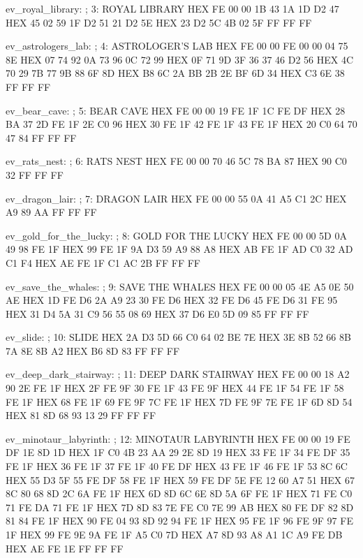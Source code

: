 \documentclass[10pt]{report}
\begin{document}
ev_royal_library:                       ; 3: ROYAL LIBRARY
    HEX FE 00 00 1B 43 1A 1D D2 47
    HEX 45 02 59 1F D2 51 21 D2 5E
    HEX 23 D2 5C 4B 02 5F FF FF FF

ev_astrologers_lab:                     ; 4: ASTROLOGER'S LAB
    HEX FE 00 00 FE 00 00 04 75 8E
    HEX 07 74 92 0A 73 96 0C 72 99
    HEX 0F 71 9D 3F 36 37 46 D2 56
    HEX 4C 70 29 7B 77 9B 88 6F 8D
    HEX B8 6C 2A BB 2B 2E BF 6D 34
    HEX C3 6E 38 FF FF FF

ev_bear_cave:                           ; 5: BEAR CAVE
    HEX FE 00 00 19 FE 1F 1C FE DF
    HEX 28 BA 37 2D FE 1F 2E C0 96
    HEX 30 FE 1F 42 FE 1F 43 FE 1F
    HEX 20 C0 64 70 47 84 FF FF FF

ev_rats_nest:                           ; 6: RATS NEST
    HEX FE 00 00 70 46 5C 78 BA 87
    HEX 90 C0 32 FF FF FF

ev_dragon_lair:                         ; 7: DRAGON LAIR
    HEX FE 00 00 55 0A 41 A5 C1 2C
    HEX A9 89 AA FF FF FF

ev_gold_for_the_lucky:                  ; 8: GOLD FOR THE LUCKY
    HEX FE 00 00 5D 0A 49 98 FE 1F
    HEX 99 FE 1F 9A D3 59 A9 88 A8
    HEX AB FE 1F AD C0 32 AD C1 F4
    HEX AE FE 1F C1 AC 2B FF FF FF

ev_save_the_whales:                     ; 9: SAVE THE WHALES
    HEX FE 00 00 05 4E A5 0E 50 AE
    HEX 1D FE D6 2A A9 23 30 FE D6
    HEX 32 FE D6 45 FE D6 31 FE 95
    HEX 31 D4 5A 31 C9 56 55 08 69
    HEX 37 D6 E0 5D 09 85 FF FF FF

ev_slide:                               ; 10: SLIDE
    HEX 2A D3 5D 66 C0 64 02 BE 7E
    HEX 3E 8B 52 66 8B 7A 8E 8B A2
    HEX B6 8D 83 FF FF FF

ev_deep_dark_stairway:                  ; 11: DEEP DARK STAIRWAY
    HEX FE 00 00 18 A2 90 2E FE 1F
    HEX 2F FE 9F 30 FE 1F 43 FE 9F
    HEX 44 FE 1F 54 FE 1F 58 FE 1F
    HEX 68 FE 1F 69 FE 9F 7C FE 1F
    HEX 7D FE 9F 7E FE 1F 6D 8D 54
    HEX 81 8D 68 93 13 29 FF FF FF

ev_minotaur_labyrinth:                  ; 12: MINOTAUR LABYRINTH
    HEX FE 00 00 19 FE DF 1E 8D 1D
    HEX 1F C0 4B 23 AA 29 2E 8D 19
    HEX 33 FE 1F 34 FE DF 35 FE 1F
    HEX 36 FE 1F 37 FE 1F 40 FE DF
    HEX 43 FE 1F 46 FE 1F 53 8C 6C
    HEX 55 D3 5F 55 FE DF 58 FE 1F
    HEX 59 FE DF 5E FE 12 60 A7 51
    HEX 67 8C 80 68 8D 2C 6A FE 1F
    HEX 6D 8D 6C 6E 8D 5A 6F FE 1F
    HEX 71 FE C0 71 FE DA 71 FE 1F
    HEX 7D 8D 83 7E FE C0 7E 99 AB
    HEX 80 FE DF 82 8D 81 84 FE 1F
    HEX 90 FE 04 93 8D 92 94 FE 1F
    HEX 95 FE 1F 96 FE 9F 97 FE 1F
    HEX 99 FE 9E 9A FE 1F A5 C0 7D
    HEX A7 8D 93 A8 A1 1C A9 FE DB
    HEX AE FE 1E FF FF FF
\end{document}
